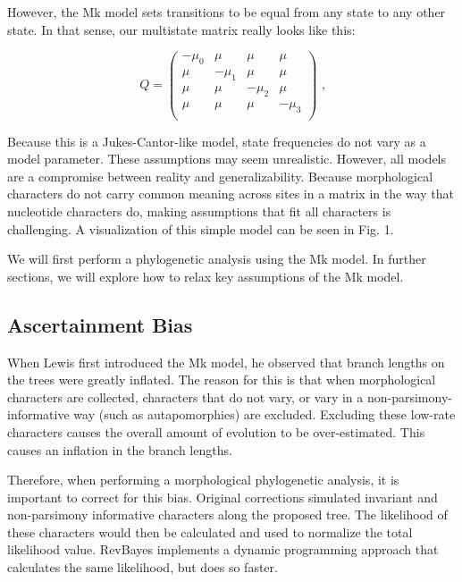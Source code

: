 However, the Mk model sets transitions to be equal from any state to any other state. 
In that sense, our multistate matrix really looks like this:

\begin{equation*}
Q = \begin{pmatrix} -\mu_0 & \mu & \mu & \mu \\
\mu & -\mu_1  & \mu & \mu \\
\mu & \mu & -\mu_2  & \mu \\
\mu & \mu & \mu & -\mu_3 \\
\end{pmatrix} \mbox{  ,}
\end{equation*}

Because this is a Jukes-Cantor-like model, state frequencies do not vary as a model parameter.
These assumptions may seem unrealistic.
However, all models are a compromise between reality and generalizability.
Because morphological characters do not carry common meaning across sites in a matrix in the way that nucleotide characters do, making assumptions that fit all characters is challenging. 
A visualization of this simple model can be seen in Fig. 1.\par

We will first perform a phylogenetic analysis using the Mk model.
In further sections, we will explore how to relax key assumptions of the Mk model. \par

\subsection{Ascertainment Bias}

When Lewis first introduced the Mk model, he observed that branch lengths on the trees were greatly inflated.
The reason for this is that when morphological characters are collected, characters that do not vary, or vary in a non-parsimony-informative way (such as autapomorphies) are excluded.
Excluding these low-rate characters causes the overall amount of evolution to be over-estimated.
This causes an inflation in the branch lengths. \par

Therefore, when performing a morphological phylogenetic analysis, it is important to correct for this bias.
Original corrections simulated invariant and non-parsimony informative characters along the proposed tree.
The likelihood of these characters would then be calculated and used to normalize the total likelihood value.
RevBayes implements a dynamic programming approach that calculates the same likelihood, but  does so faster. \par

